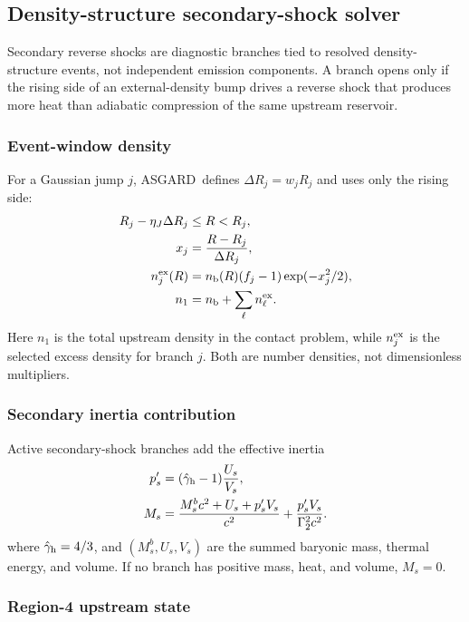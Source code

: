 \documentclass[twocolumn]{aastex702}
\newcommand{\asgard}{\textsc{ASGARD}}
\begin{document}
\subsection{Density-structure secondary-shock solver}

Secondary reverse shocks are diagnostic branches tied to resolved density-structure events, not
independent emission components.  A branch opens only if the rising side of an
external-density bump drives a reverse shock that produces more heat than
adiabatic compression of the same upstream reservoir.

\subsubsection{Event-window density}

For a Gaussian jump \(j\), \asgard\ defines \(\Delta R_j=w_jR_j\) and uses only
the rising side:
\begin{equation}
\begin{aligned}
R_j-\eta_J\Delta R_j&\le R<R_j,\\
x_j&=\frac{R-R_j}{\Delta R_j},\\
n_j^{\rm ex}(R)&=n_{\rm b}(R)(f_j-1)\exp(-x_j^2/2),\\
n_1&=n_{\rm b}+\sum_{\ell}n_\ell^{\rm ex}.
\end{aligned}
\end{equation}
Here \(n_1\) is the total upstream density in the contact problem, while
\(n_j^{\rm ex}\) is the selected excess density for branch \(j\).  Both are
number densities, not dimensionless multipliers.

\subsubsection{Secondary inertia contribution}

Active secondary-shock branches add the effective inertia
\begin{equation}
\begin{aligned}
p'_s&=(\hat\gamma_{\rm h}-1)\frac{U_s}{V_s},\\
M_s&=\frac{M_s^bc^2+U_s+p'_sV_s}{c^2}
+\frac{p'_sV_s}{\Gamma_2^2c^2}.
\end{aligned}
\end{equation}
where \(\hat\gamma_{\rm h}=4/3\), and \((M_s^b,U_s,V_s)\) are the summed baryonic
mass, thermal energy, and volume.  If no branch has positive mass, heat, and
volume, \(M_s=0\).

\subsubsection{Region-4 upstream state}
\end{document}
